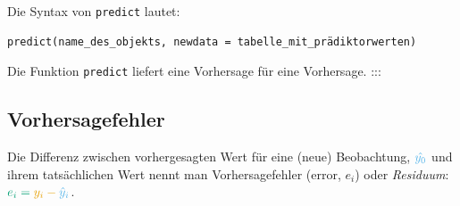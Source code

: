 \documentclass[
  letterpaper,
]{scrbook}
\theoremstyle{definition}
\theoremstyle{definition}
\theoremstyle{definition}
\theoremstyle{remark}
\begin{document}
Die Syntax von \texttt{predict} lautet:

\begin{verbatim}
predict(name_des_objekts, newdata = tabelle_mit_prädiktorwerten)
\end{verbatim}

Die Funktion \texttt{predict} liefert eine Vorhersage für eine
Vorhersage. :::

\subsection{Vorhersagefehler}\label{vorhersagefehler}

Die Differenz zwischen vorhergesagten Wert für eine (neue) Beobachtung,
\(\color{modelcol}{\hat{y_0}}\) und ihrem tatsächlichen Wert nennt man
Vorhersagefehler (error, \(e_i\)) oder \emph{Residuum}:
\(\color{errorcol}{e_i} = \color{ycol}{y_i} - \color{modelcol}{\hat{y}_i}\).
\end{document}

